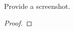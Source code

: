 \documentclass[../../main.tex]{subfiles}
\begin{document}
\begin{wts}
Provide a screenshot.  
\end{wts}
\begin{proof}

\end{proof}
\end{document}
